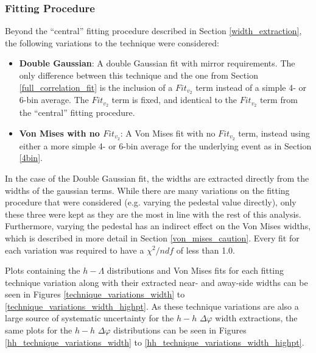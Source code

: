 \documentclass[ALICE,manyauthors]{ALICE_analysis_notes}
\begin{document}
\subsubsection{Fitting Procedure}
\label{fitting_procedure_systematics_width}
Beyond the ``central'' fitting procedure described in Section \ref{width_extraction}, the following variations to the technique were considered:
\begin{itemize}
	\item \textbf{Double Gaussian}: A double Gaussian fit with mirror requirements. The only difference between this technique and the one from Section \ref{full_correlation_fit} is the inclusion of a $Fit_{v_{2}}$ term instead of a simple 4- or 6-bin average. The $Fit_{v_{2}}$ term is fixed, and identical to the $Fit_{v_{2}}$ term from the ``central'' fitting procedure.
	\item \textbf{Von Mises with no $Fit_{v_{2}}$}: A Von Mises fit with no $Fit_{v_{2}}$ term, instead using either a more simple 4- or 6-bin average for the underlying event as in Section \ref{4bin}.
\end{itemize}

In the case of the Double Gaussian fit, the widths are extracted directly from the widths of the gaussian terms. While there are many variations on the fitting procedure that were considered (e.g. varying the pedestal value directly), only these three were kept as they are the most in line with the rest of this analysis. Furthermore, varying the pedestal has an indirect effect on the Von Mises widths, which is described in more detail in Section \ref{von_mises_caution}. Every fit for each variation was required to have a $\chi^{2}/ndf$ of less than 1.0.

Plots containing the $h-\Lambda$ distributions and Von Mises fits for each fitting technique variation along with their extracted near- and away-side widths can be seen in Figures \ref{technique_variations_width} to \ref{technique_variations_width_highpt}. As these technique variations are also a large source of systematic uncertainty for the $h-h$ $\Delta\varphi$ width extractions, the same plots for the $h-h$ $\Delta\varphi$ distributions can be seen in Figures \ref{hh_technique_variations_width} to \ref{hh_technique_variations_width_highpt}.
\end{document}
